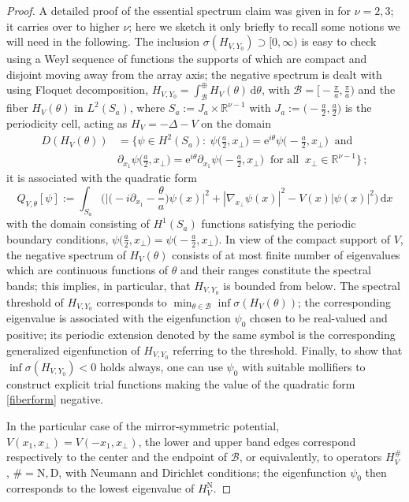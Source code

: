 \documentclass{article}
\numberwithin{equation}{section}
\theoremstyle{definition}
\newcommand{\D}{\mathrm{d}}
\newcommand{\e}{\mathrm{e}}
\newcommand{\R}{\mathbb{R}}
\newcommand{\BB}{\mathcal{B}}
\begin{document}
\begin{proof}
A detailed proof of the essential spectrum claim was given in \cite{Ex24} for $\nu=2,3$; it carries over to higher $\nu$; here we sketch it only briefly to recall some notions we will need in the following. The inclusion $\sigma(H_{V,Y_0})\supset[0,\infty)$ is easy to check using a Weyl sequence of functions the supports of which are compact and disjoint moving away from the array axis; the negative spectrum is dealt with using Floquet decomposition, $H_{V,Y_0} = \int_\BB^\oplus H_V(\theta)\,\D\theta$, with $\BB=\big[\!-\!\frac{\pi}{a}, \frac{\pi}{a}\big)$ and the fiber $H_V(\theta)$ in $L^2(S_a)$, where $S_a:= J_a\times\R^{\nu-1}$ with $J_a:=\big(-\frac{a}{2}, \frac{a}{2}\big)$ is the periodicity cell, acting as $H_V = -\Delta - V$ on the domain
 \begin{align} \label{fiberdom}
D(H_V(\theta)) & = \Big\{ \psi\in H^2(S_a):\: \psi\big(\textstyle{\frac{a}{2}},x_\perp\big) = \e^{i\theta} \psi\big(-\textstyle{\frac{a}{2}},x_\perp\big) \;\; \text{and} \\ & \partial_{x_1}\psi\big(\textstyle{\frac{a}{2}},x_\perp\big) = \e^{i\theta} \partial_{x_1}\psi\big(-\textstyle{\frac{a}{2}},x_\perp\big) \;\;\text{for all}\;\; x_\perp\in\R^{\nu-1}\Big\}\,; \nonumber
 \end{align}
it is associated with the quadratic form
 \begin{equation} \label{fiberform}
Q_{V,\theta}[\psi] := \int_{S_a} \Big(\big|\big(-i\partial_{x_1} -\textstyle{\frac{\theta}{a}}\big)\psi(x)\big|^2 + |\nabla_{x_\perp}\psi(x)|^2 - V(x)|\psi(x)|^2\Big)\, \D x
 \end{equation}
with the domain consisting of $H^1(S_a)$ functions satisfying the periodic boundary conditions, $\psi\big(\frac{a}{2},x_\perp\big) = \psi\big(\!-\!\frac{a}{2},x_\perp\big)$. In view of the compact support of $V$, the negative spectrum of $H_V(\theta)$ consists of at most finite number of eigenvalues which are continuous functions of $\theta$ and their ranges constitute the spectral bands; this implies, in particular, that $H_{V,Y_0}$ is bounded from below. The spectral threshold of $H_{V,Y_0}$ corresponds to $\min_{\theta\in\BB} \inf\sigma(H_V(\theta))$; the corresponding eigenvalue is associated with the eigenfunction $\psi_0$ chosen to be real-valued and positive; its periodic extension denoted by the same symbol is the corresponding generalized eigenfunction of $H_{V,Y_0}$ referring to the threshold. Finally, to show that $\inf\sigma(H_{V,Y_0})<0$ holds always, one can use $\psi_0$ with suitable mollifiers to construct explicit trial functions making the value of the quadratic form \eqref{fiberform} negative.

In the particular case of the mirror-symmetric potential, $V(x_1,x_\perp)=V(-x_1,x_\perp)$, the lower and upper band edges correspond respectively to the center and the endpoint of $\BB$, or equivalently, to operators $H_V^\#$, $\#=\mathrm{N}, \mathrm{D}$, with Neumann and Dirichlet conditions; the eigenfunction $\psi_0$ then corresponds to the lowest eigenvalue of $H_V^\mathrm{N}$.
\end{proof}
\end{document}

